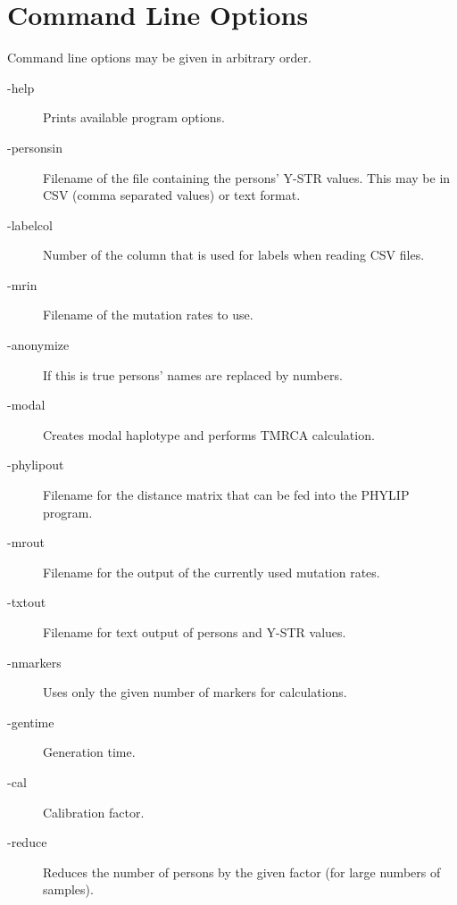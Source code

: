 \section{Command Line Options}

Command line options may be given in arbitrary order.

\begin{description}
\item[-help] Prints available program options.
\item[-personsin] Filename of the file containing the persons' Y-STR values.
	This may be in CSV (comma separated values) or text format.
\item[-labelcol] Number of the column that is used for labels
	when reading CSV files.
\item[-mrin] Filename of the mutation rates to use.
\item[-anonymize] If this is true persons' names are replaced by numbers.
\item[-modal] Creates modal haplotype and performs TMRCA calculation.
\item[-phylipout] Filename for the distance matrix that can be fed into
	the PHYLIP\cite{Phylip} program.
\item[-mrout] Filename for the output of the currently used mutation rates.
\item[-txtout] Filename for text output of persons and Y-STR values.
\item[-nmarkers] Uses only the given number of markers for calculations.
\item[-gentime] Generation time.
\item[-cal] Calibration factor.
\item[-reduce] Reduces the number of persons by the given factor
	 (for large numbers of samples).
\end{description}


